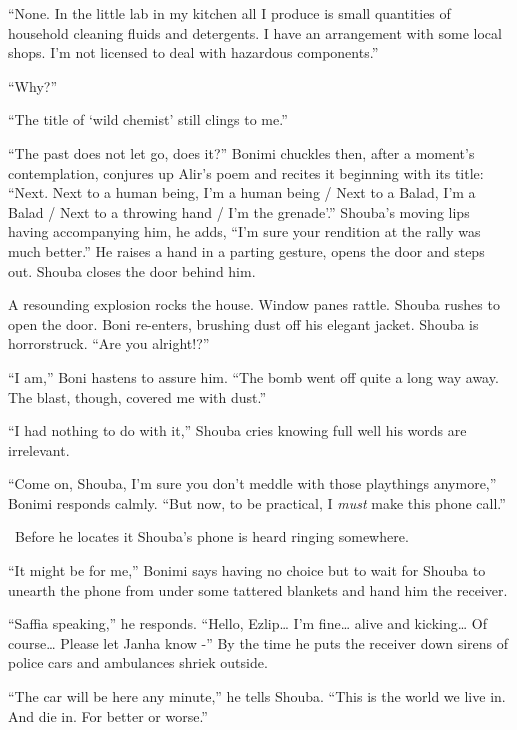 \documentclass[twoside,11pt]{book}
\begin{document}
``None. In the little lab in my kitchen all I produce is small quantities of household cleaning fluids and
detergents. I have an arrangement with some local shops. I'm not licensed to deal with hazardous
components.''

``Why?''

``The title of `wild chemist' still clings to me.''

``The past does not let go, does it?'' Bonimi chuckles then, after a moment's contemplation,
conjures up Alir's poem and recites it beginning with its title: ``Next.
%
Next to a human being, I'm a human being / Next to a Balad, I'm a Balad / Next to a throwing hand / I'm the
grenade'.'' Shouba's moving lips having accompanying him, he adds, ``I'm sure your rendition
at the rally was much better.'' He raises a hand in a parting gesture, opens the door and steps out.
Shouba closes the door behind him.

A resounding explosion rocks the house. Window panes rattle. Shouba rushes to open the door. Boni re-enters, brushing
dust off his elegant jacket. Shouba is horrorstruck. ``Are you alright!?''

``I am,'' Boni hastens to assure him. ``The bomb went off quite a long way away. The blast, though, covered
me with dust.''

``I had nothing to do with it,'' Shouba cries knowing full well his words are irrelevant.

``Come on, Shouba, I'm sure you don't meddle with those playthings anymore,'' Bonimi responds
calmly. ``But now, to be practical, I \textit{must} make this phone call.''

\ Before he locates it Shouba's phone is heard ringing somewhere.

``It might be for me,'' Bonimi says having no choice but to wait for Shouba to unearth the
phone from under some tattered blankets and hand him the receiver.

``Saffia speaking,'' he responds. ``Hello, Ezlip{\dots} I'm fine{\ldots} alive and
kicking{\ldots} Of course{\dots} Please let Janha know -'' By the time he puts the receiver down sirens of
police cars and ambulances shriek outside.

``The car will be here any minute,'' he tells Shouba. ``This is the world we live
in. And die in. For better or worse.''


\bigskip

\chapter{}
\end{document}

